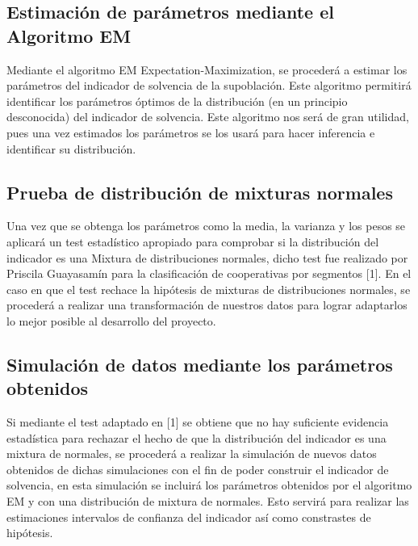 \documentclass[
]{article}
\begin{document}
\hypertarget{estimaciuxf3n-de-paruxe1metros-mediante-el-algoritmo-em}{%
\subsection{Estimación de parámetros mediante el Algoritmo
EM}\label{estimaciuxf3n-de-paruxe1metros-mediante-el-algoritmo-em}}

Mediante el algoritmo EM Expectation-Maximization, se procederá a
estimar los parámetros del indicador de solvencia de la supoblación.
Este algoritmo permitirá identificar los parámetros óptimos de la
distribución (en un principio desconocida) del indicador de solvencia.
Este algoritmo nos será de gran utilidad, pues una vez estimados los
parámetros se los usará para hacer inferencia e identificar su
distribución.

\hypertarget{prueba-de-distribuciuxf3n-de-mixturas-normales}{%
\subsection{Prueba de distribución de mixturas
normales}\label{prueba-de-distribuciuxf3n-de-mixturas-normales}}

Una vez que se obtenga los parámetros como la media, la varianza y los
pesos se aplicará un test estadístico apropiado para comprobar si la
distribución del indicador es una Mixtura de distribuciones normales,
dicho test fue realizado por Priscila Guayasamín para la clasificación
de cooperativas por segmentos {[}1{]}. En el caso en que el test rechace
la hipótesis de mixturas de distribuciones normales, se procederá a
realizar una transformación de nuestros datos para lograr adaptarlos lo
mejor posible al desarrollo del proyecto.

\hypertarget{simulaciuxf3n-de-datos-mediante-los-paruxe1metros-obtenidos}{%
\subsection{Simulación de datos mediante los parámetros
obtenidos}\label{simulaciuxf3n-de-datos-mediante-los-paruxe1metros-obtenidos}}

Si mediante el test adaptado en {[}1{]} se obtiene que no hay suficiente
evidencia estadística para rechazar el hecho de que la distribución del
indicador es una mixtura de normales, se procederá a realizar la
simulación de nuevos datos obtenidos de dichas simulaciones con el fin
de poder construir el indicador de solvencia, en esta simulación se
incluirá los parámetros obtenidos por el algoritmo EM y con una
distribución de mixtura de normales. Esto servirá para realizar las
estimaciones intervalos de confianza del indicador así como constrastes
de hipótesis.
\end{document}
